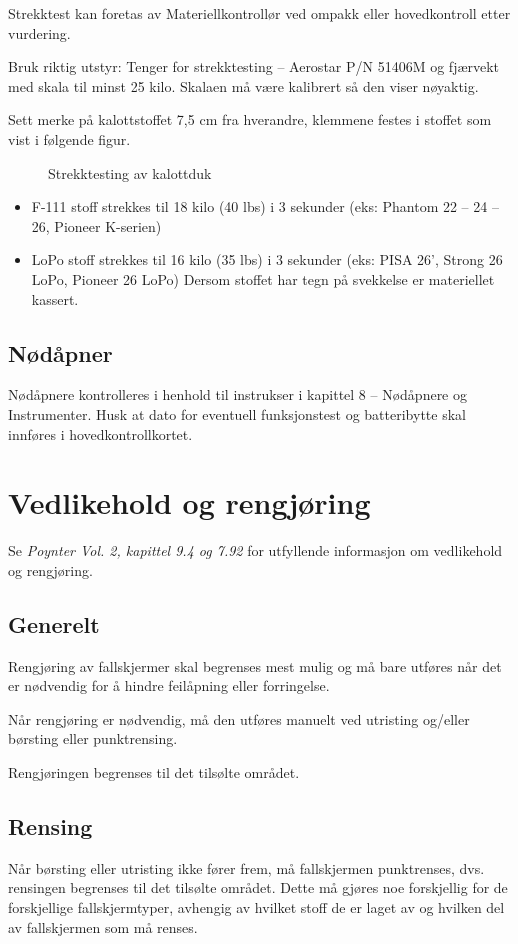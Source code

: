 Strekktest kan foretas av Materiellkontrollør ved ompakk eller hovedkontroll etter vurdering.

Bruk riktig utstyr: Tenger for strekktesting – Aerostar P/N 51406M og fjærvekt med skala til minst 25 kilo. Skalaen må være kalibrert så den viser nøyaktig.

Sett merke på kalottstoffet 7,5 cm fra hverandre, klemmene festes i stoffet som vist i følgende figur.

\begin{figure}
	\caption{Strekktesting av kalottduk}
\end{figure}

\begin{itemize}
	\item F-111 stoff strekkes til 18 kilo (40 lbs) i 3 sekunder
	(eks: Phantom 22 – 24 – 26, Pioneer K-serien)
	\item LoPo stoff strekkes til 16 kilo (35 lbs) i 3 sekunder
	(eks: PISA 26’, Strong 26 LoPo, Pioneer 26 LoPo) Dersom stoffet har tegn på svekkelse er materiellet kassert.
\end{itemize}

\subsection{Nødåpner}
Nødåpnere kontrolleres i henhold til instrukser i kapittel 8 – Nødåpnere og Instrumenter.
Husk at dato for eventuell funksjonstest og batteribytte skal innføres i hovedkontrollkortet.

\section{Vedlikehold og rengjøring}
Se \emph{Poynter Vol. 2, kapittel 9.4 og 7.92} for utfyllende informasjon om vedlikehold og rengjøring.

\subsection{Generelt}
Rengjøring av fallskjermer skal begrenses mest mulig og må bare utføres når det er nødvendig for å hindre feilåpning eller forringelse.

Når rengjøring er nødvendig, må den utføres manuelt ved utristing og/eller børsting eller punktrensing.

Rengjøringen begrenses til det tilsølte området.

\subsection{Rensing}
Når børsting eller utristing ikke fører frem, må fallskjermen punktrenses, dvs. rensingen begrenses til det tilsølte området. Dette må gjøres noe forskjellig for de forskjellige fallskjermtyper, avhengig av hvilket stoff de er laget av og hvilken del av fallskjermen som må renses.

